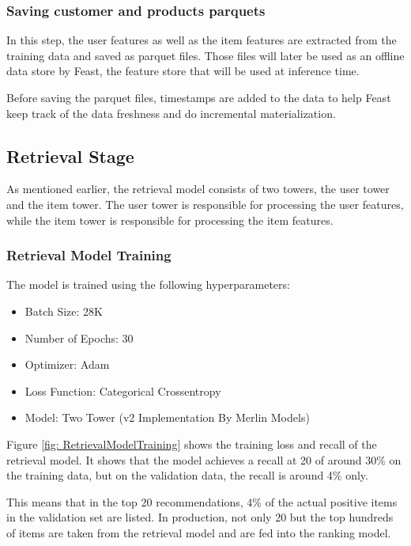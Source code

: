 \subsubsection{Saving customer and products parquets}

In this step, the user features as well as the item features are extracted from the training data and saved as parquet files.
Those files will later be used as an offline data store by Feast, the feature store that will be used at inference time.

Before saving the parquet files, timestamps are added to the data to help Feast keep track of the data freshness and do incremental materialization.

\subsection{Retrieval Stage}

As mentioned earlier, the retrieval model consists of two towers, the user tower and the item tower. 
The user tower is responsible for processing the user features, while the item tower is responsible for processing the item features.

\subsubsection{Retrieval Model Training}

The model is trained using the following hyperparameters:

\begin{itemize}
\item Batch Size: 28K
\item Number of Epochs: 30
\item Optimizer: Adam
\item Loss Function: Categorical Crossentropy
\item Model: Two Tower (v2 Implementation By Merlin Models)
\end{itemize}

Figure \ref{fig: RetrievalModelTraining} shows the training loss and recall of the retrieval model.
It shows that the model achieves a recall at 20 of around 30\% on the training data, but on the validation data, the recall is around 4\% only.

This means that in the top 20 recommendations, 4\% of the actual positive items in the validation set are listed.
In production, not only 20 but the top hundreds of items are taken from the retrieval model and are fed into the ranking model. 

